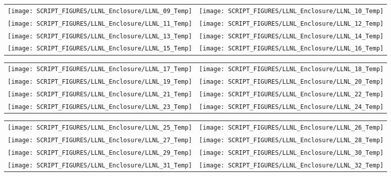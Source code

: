 \begin{figure}[!ht]
\begin{tabular*}{\textwidth}{l@{\extracolsep{\fill}}r}
\texttt{[image: SCRIPT\_FIGURES/LLNL\_Enclosure/LLNL\_09\_Temp]} &
\texttt{[image: SCRIPT\_FIGURES/LLNL\_Enclosure/LLNL\_10\_Temp]} \\
\texttt{[image: SCRIPT\_FIGURES/LLNL\_Enclosure/LLNL\_11\_Temp]} &
\texttt{[image: SCRIPT\_FIGURES/LLNL\_Enclosure/LLNL\_12\_Temp]} \\
\texttt{[image: SCRIPT\_FIGURES/LLNL\_Enclosure/LLNL\_13\_Temp]} &
\texttt{[image: SCRIPT\_FIGURES/LLNL\_Enclosure/LLNL\_14\_Temp]} \\
 \texttt{[image: SCRIPT\_FIGURES/LLNL\_Enclosure/LLNL\_15\_Temp]} &
\texttt{[image: SCRIPT\_FIGURES/LLNL\_Enclosure/LLNL\_16\_Temp]}
\end{tabular*}
\label{LLNL_Enclosure_Temp_2}
\end{figure}

\begin{figure}[!ht]
\begin{tabular*}{\textwidth}{l@{\extracolsep{\fill}}r}
 \texttt{[image: SCRIPT\_FIGURES/LLNL\_Enclosure/LLNL\_17\_Temp]} &
 \texttt{[image: SCRIPT\_FIGURES/LLNL\_Enclosure/LLNL\_18\_Temp]} \\
\texttt{[image: SCRIPT\_FIGURES/LLNL\_Enclosure/LLNL\_19\_Temp]} &
 \texttt{[image: SCRIPT\_FIGURES/LLNL\_Enclosure/LLNL\_20\_Temp]} \\
\texttt{[image: SCRIPT\_FIGURES/LLNL\_Enclosure/LLNL\_21\_Temp]} &
\texttt{[image: SCRIPT\_FIGURES/LLNL\_Enclosure/LLNL\_22\_Temp]} \\
\texttt{[image: SCRIPT\_FIGURES/LLNL\_Enclosure/LLNL\_23\_Temp]} &
\texttt{[image: SCRIPT\_FIGURES/LLNL\_Enclosure/LLNL\_24\_Temp]}
\end{tabular*}
\label{LLNL_Enclosure_Temp_3}
\end{figure}

\begin{figure}[!ht]
\begin{tabular*}{\textwidth}{l@{\extracolsep{\fill}}r}
\texttt{[image: SCRIPT\_FIGURES/LLNL\_Enclosure/LLNL\_25\_Temp]} &
\texttt{[image: SCRIPT\_FIGURES/LLNL\_Enclosure/LLNL\_26\_Temp]} \\
\texttt{[image: SCRIPT\_FIGURES/LLNL\_Enclosure/LLNL\_27\_Temp]} &
\texttt{[image: SCRIPT\_FIGURES/LLNL\_Enclosure/LLNL\_28\_Temp]} \\
\texttt{[image: SCRIPT\_FIGURES/LLNL\_Enclosure/LLNL\_29\_Temp]} &
\texttt{[image: SCRIPT\_FIGURES/LLNL\_Enclosure/LLNL\_30\_Temp]} \\
\texttt{[image: SCRIPT\_FIGURES/LLNL\_Enclosure/LLNL\_31\_Temp]} &
\texttt{[image: SCRIPT\_FIGURES/LLNL\_Enclosure/LLNL\_32\_Temp]}
\end{tabular*}
\label{LLNL_Enclosure_Temp_4}
\end{figure}

